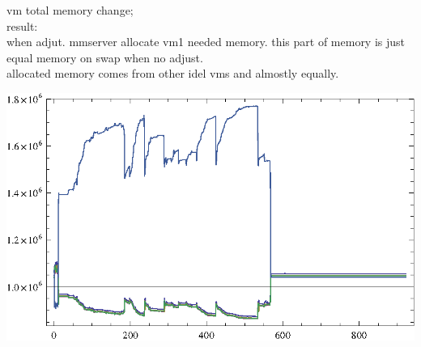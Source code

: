 \documentclass{article}
\begin{document}
vm total memory change;\\
result:\\
when adjut. mmserver allocate vm1 needed memory. this part of memory is just equal memory on swap when no adjust.\\
allocated memory comes from other idel vms and almostly equally.

\includegraphics{workload_gr9.eps}
\end{document}

